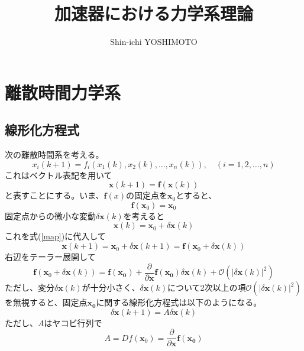 \documentclass[]{jlreq}
\begin{document}
\title{加速器における力学系理論}
\author{Shin-ichi YOSHIMOTO}
\maketitle
\tableofcontents
\clearpage


\section{離散時間力学系}
\subsection{線形化方程式}

次の離散時間系を考える。
%
\begin{equation}
    x_i(k+1) = f_i(x_1(k),x_2(k),\dots, x_n(k)), \quad (i = 1,2,\dots,n)
\end{equation}
%
これはベクトル表記を用いて
%
\begin{equation}
    \bm{x}(k+1) = \bm{f}(\bm{x}(k))
    \label{map}
\end{equation}
%
と表すことにする。いま、$\bm{f}(x)$の固定点を$\bm{x}_0$とすると、
%
\begin{equation}
    \bm{f}(\bm{x}_0) = \bm{x}_0
\end{equation}
%
固定点からの微小な変動$\delta \bm{x}(k)$を考えると
%
\begin{equation}
    \bm{x}(k) = \bm{x}_0 + \delta \bm{x}(k)
\end{equation}
%
これを式(\ref{map})に代入して
%
\begin{equation}
    \bm{x}(k+1) = \bm{x}_0 + \delta \bm{x}(k+1) = \bm{f}(\bm{x}_0+\delta \bm{x}(k))
\end{equation}
%
右辺をテーラー展開して
%
\begin{equation}
    \bm{f}(\bm{x}_0+\delta \bm{x}(k)) = \bm{f}(\bm{x_0})+\frac{\partial}{\partial\bm{x}}\bm{f}(\bm{x_0})\delta \bm{x}(k) + 
    \mathcal{O}(|\delta \bm{x}(k)|^2)
\end{equation}
%
ただし、変分$\delta \bm{x}(k)$が十分小さく、$\delta \bm{x}(k)$について2次以上の項$\mathcal{O}(|\delta \bm{x}(k)|^2)$を無視すると、固定点$\bm{x_0}$に関する線形化方程式は以下のようになる。
%
\begin{equation}
    \delta\bm{x}(k+1) = A \delta \bm{x}(k) 
\end{equation}
%
ただし、$A$はヤコビ行列で
%
\begin{equation}
    A = D f(\bm{x}_0) = \frac{\partial}{\partial\bm{x}}\bm{f}(\bm{x_0})
\end{equation}
%
\end{document}

